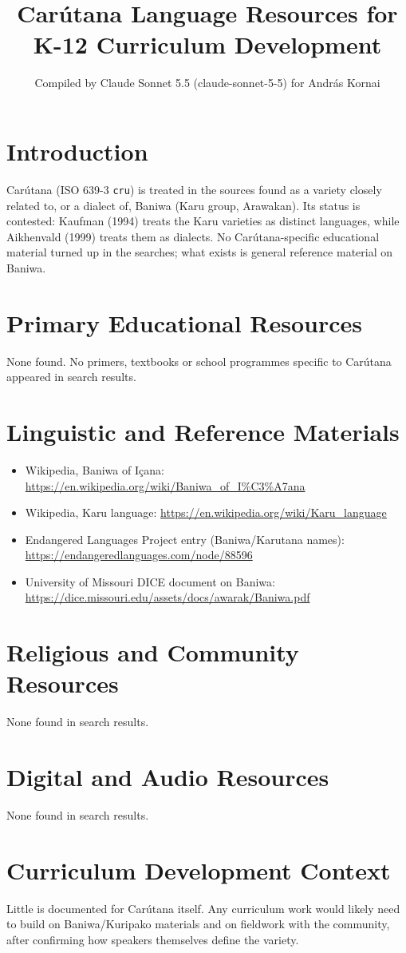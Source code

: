 \documentclass[12pt]{article}
\title{Carútana Language Resources for K-12 Curriculum Development}
\author{Compiled by Claude Sonnet 5.5 (claude-sonnet-5-5) for Andr\'as Kornai}
\date{}
\begin{document}
\maketitle

\section{Introduction}
Carútana (ISO 639-3 \texttt{cru}) is treated in the sources found as a variety closely related to, or a dialect of, Baniwa (Karu group, Arawakan). Its status is contested: Kaufman (1994) treats the Karu varieties as distinct languages, while Aikhenvald (1999) treats them as dialects. No Carútana-specific educational material turned up in the searches; what exists is general reference material on Baniwa.

\section{Primary Educational Resources}
None found. No primers, textbooks or school programmes specific to Carútana appeared in search results.

\section{Linguistic and Reference Materials}
\begin{itemize}
\item Wikipedia, Baniwa of I\c{c}ana: \url{https://en.wikipedia.org/wiki/Baniwa_of_I%C3%A7ana}
\item Wikipedia, Karu language: \url{https://en.wikipedia.org/wiki/Karu_language}
\item Endangered Languages Project entry (Baniwa/Karutana names): \url{https://endangeredlanguages.com/node/88596}
\item University of Missouri DICE document on Baniwa: \url{https://dice.missouri.edu/assets/docs/awarak/Baniwa.pdf}
\end{itemize}

\section{Religious and Community Resources}
None found in search results.

\section{Digital and Audio Resources}
None found in search results.

\section{Curriculum Development Context}
Little is documented for Carútana itself. Any curriculum work would likely need to build on Baniwa/Kuripako materials and on fieldwork with the community, after confirming how speakers themselves define the variety.
\end{document}
